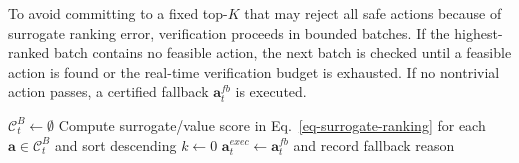 To avoid committing to a fixed top-$K$ that may reject all safe actions because of surrogate ranking error, verification proceeds in bounded batches. If the highest-ranked batch contains no feasible action, the next batch is checked until a feasible action is found or the real-time verification budget is exhausted. If no nontrivial action passes, a certified fallback $\mathbf{a}^{fb}_t$ is executed.

\begin{algorithm}[t]
\caption{Risk-Aware Recovery Constraint Synthesis}
\label{alg-risk-gate}
$\mathcal{C}_t^{B}\leftarrow\emptyset$\;
Compute surrogate/value score in Eq.~\ref{eq-surrogate-ranking} for each $\mathbf{a}\in\mathcal{C}_t^{B}$ and sort descending\;
$k\leftarrow0$\;
$\mathbf{a}^{exec}_t\leftarrow\mathbf{a}^{fb}_t$ and record fallback reason\;
\;
\end{algorithm}

